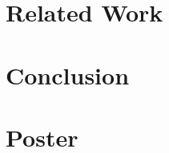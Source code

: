 \documentclass[master=cws, masteroption=ai]{kulemt}
\begin{document}
\chapter{Related Work}\label{related}


\chapter{Conclusion}\label{conclusion}


\appendixpage*
\appendix



\chapter{Poster}\label{poster}


\backmatter



\end{document}
